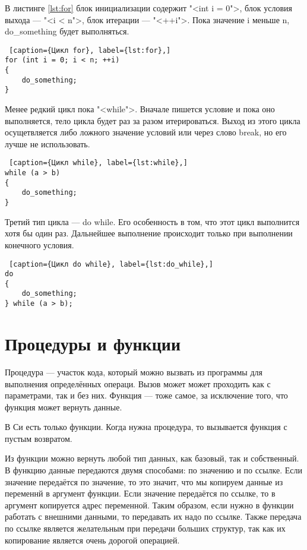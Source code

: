 \documentclass{bmstu}
\begin{document}
В листинге \ref{lst:for} блок инициализации содержит "<int i = 0">, 
блок условия выхода --- "<i < n">, блок итерации --- "<++i">.
Пока значение i меньше n, do\_something будет выполняться.

\begin{lstlisting} [caption={Цикл for}, label={lst:for},]
for (int i = 0; i < n; ++i)
{
    do_something;
}
\end{lstlisting}

Менее редкий цикл пока "<while">. 
Вначале пишется условие и пока оно выполняется, тело цикла будет раз за разом итерироваться.
Выход из этого цикла осущетвляется либо ложного значение условий или через слово break, но его лучше не использовать.

\begin{lstlisting} [caption={Цикл while}, label={lst:while},]
while (a > b)
{
    do_something;
}
\end{lstlisting}

Третий тип цикла --- do while.
Его особенность в том, что этот цикл выполнится хотя бы один раз.
Дальнейшее выполнение происходит только при выполнении конечного условия.

\begin{lstlisting} [caption={Цикл do while}, label={lst:do_while},]
do 
{
    do_something;
} while (a > b);
\end{lstlisting}

\section{Процедуры и функции}

Процедура --- участок кода, который можно вызвать из программы для выполнения определённых операци.
Вызов может может проходить как с параметрами, так и без них.
Функция --- тоже самое, за исключение того, что функция может вернуть данные.

В Си есть только функции. 
Когда нужна процедура, то вызывается функция с пустым возвратом.

Из функции можно вернуть любой тип данных, как базовый, так и собственный.
В функцию данные передаются двумя способами: по значению и по ссылке.
Если значение передаётся по значение, то это значит, что мы копируем данные из переменнй в аргумент функции.
Если значение передаётся по ссылке, то в аргумент копируется адрес переменной.
Таким образом, если нужно в функции работать с внешними данными, то передавать их надо по ссылке.
Также передача по ссылке является желательным при передачи больших структур, так как их копирование является очень дорогой операцией.
\end{document}
